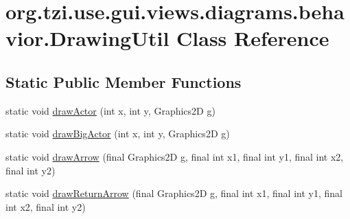 \hypertarget{classorg_1_1tzi_1_1use_1_1gui_1_1views_1_1diagrams_1_1behavior_1_1_drawing_util}{\section{org.\-tzi.\-use.\-gui.\-views.\-diagrams.\-behavior.\-Drawing\-Util Class Reference}
\label{classorg_1_1tzi_1_1use_1_1gui_1_1views_1_1diagrams_1_1behavior_1_1_drawing_util}
}
\subsection*{Static Public Member Functions}
\begin{DoxyCompactItemize}
\item 
static void \hyperlink{classorg_1_1tzi_1_1use_1_1gui_1_1views_1_1diagrams_1_1behavior_1_1_drawing_util_a325bc22b4a0570d34fd58771e380eb83}{draw\-Actor} (int x, int y, Graphics2\-D g)
\item 
static void \hyperlink{classorg_1_1tzi_1_1use_1_1gui_1_1views_1_1diagrams_1_1behavior_1_1_drawing_util_ab325363b2c9754b3a21afc9a699e5b7d}{draw\-Big\-Actor} (int x, int y, Graphics2\-D g)
\item 
static void \hyperlink{classorg_1_1tzi_1_1use_1_1gui_1_1views_1_1diagrams_1_1behavior_1_1_drawing_util_afccb2f698ec40bd8ba81e6c0d0cc56e8}{draw\-Arrow} (final Graphics2\-D g, final int x1, final int y1, final int x2, final int y2)
\item 
static void \hyperlink{classorg_1_1tzi_1_1use_1_1gui_1_1views_1_1diagrams_1_1behavior_1_1_drawing_util_a68345c37e96d88d102557b14a7e260ba}{draw\-Return\-Arrow} (final Graphics2\-D g, final int x1, final int y1, final int x2, final int y2)
\end{DoxyCompactItemize}
